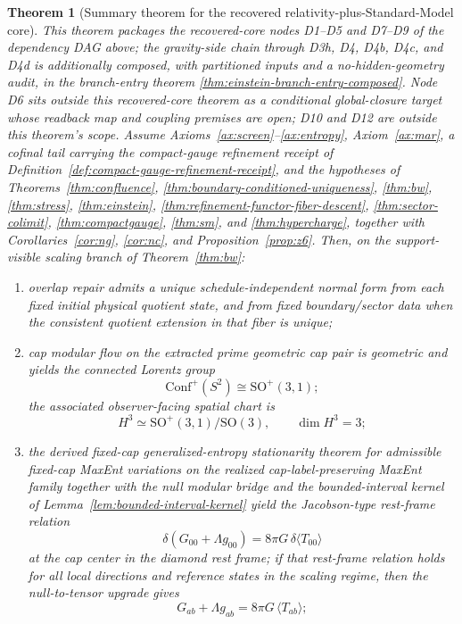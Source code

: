 \documentclass[11pt]{article}
\newtheorem{theorem}{Theorem}[section]
\newcommand{\Conf}{\mathrm{Conf}}
\begin{document}
\begin{theorem}[Summary theorem for the recovered relativity-plus-Standard-Model core]\label{thm:master}
This theorem packages the recovered-core nodes D1--D5 and D7--D9 of the dependency DAG above; the gravity-side chain through D3h, D4, D4b, D4c, and D4d is additionally composed, with partitioned inputs and a no-hidden-geometry audit, in the branch-entry theorem \ref{thm:einstein-branch-entry-composed}. Node D6 sits outside this recovered-core theorem as a conditional global-closure target whose readback map and coupling premises are open; D10 and D12 are outside this theorem's scope. Assume Axioms~\ref{ax:screen}--\ref{ax:entropy}, Axiom~\ref{ax:mar}, a cofinal tail carrying the compact-gauge refinement receipt of Definition~\ref{def:compact-gauge-refinement-receipt}, and the hypotheses of Theorems~\ref{thm:confluence}, \ref{thm:boundary-conditioned-uniqueness}, \ref{thm:bw}, \ref{thm:stress}, \ref{thm:einstein}, \ref{thm:refinement-functor-fiber-descent}, \ref{thm:sector-colimit}, \ref{thm:compactgauge}, \ref{thm:sm}, and \ref{thm:hypercharge}, together with Corollaries~\ref{cor:ng}, \ref{cor:nc}, and Proposition~\ref{prop:z6}. Then, on the support-visible scaling branch of Theorem~\ref{thm:bw}:
\begin{enumerate}[label=(\roman*),leftmargin=2em]
\item overlap repair admits a unique schedule-independent normal form from each fixed initial
physical quotient state, and from fixed boundary/sector data when the consistent quotient
extension in that fiber is unique;
\item cap modular flow on the extracted prime geometric cap pair is geometric and yields the connected Lorentz group
\[
\Conf^+(S^2)\cong \mathrm{SO}^+(3,1);
\]
the associated observer-facing spatial chart is
\[
H^3\simeq \mathrm{SO}^+(3,1)/\mathrm{SO}(3),
\qquad
\dim H^3=3;
\]
\item the derived fixed-cap generalized-entropy stationarity theorem for admissible fixed-cap MaxEnt variations on the realized cap-label-preserving MaxEnt family together with the null modular bridge and the bounded-interval kernel of Lemma~\ref{lem:bounded-interval-kernel} yield the Jacobson-type rest-frame relation
\[
\delta\!\left(G_{00}+\Lambda g_{00}\right)=8\pi G\,\delta\langle T_{00}\rangle
\]
at the cap center in the diamond rest frame; if that rest-frame relation holds for all local directions and reference states in the scaling regime, then the null-to-tensor upgrade gives
\[
G_{ab}+\Lambda g_{ab}=8\pi G\,\langle T_{ab}\rangle;
\]
\end{enumerate}
\end{theorem}
\end{document}
